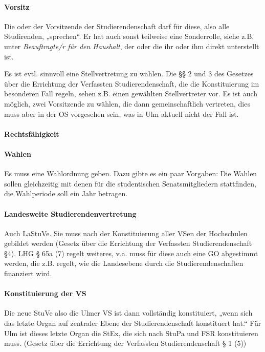 \documentclass[
10pt,
a4paper,
twoside,								%
titlepage=false,							%
draft=false								%
]{scrartcl}
\begin{document}
\paragraph{Vorsitz}

Die oder der Vorsitzende der Studierendenschaft darf für diese, also alle Studirenden, „sprechen“. Er hat auch sonst teilweise eine Sonderrolle, siehe z.B. unter \emph{Beauftragte/r für den Haushalt}, der oder die ihr oder ihm direkt unterstellt ist.

Es ist evtl. sinnvoll eine Stellvertretung zu wählen. Die §§ 2 und 3 des Gesetzes über die Errichtung der Verfassten Studierendenschaft, die die Konstituierung im besonderen Fall regeln, sehen z.B. einen gewählten Stellvertreter vor. Es ist auch möglich, zwei Vorsitzende zu wählen, die dann gemeinschaftlich vertreten, dies muss aber in der OS vorgesehen sein, was in Ulm aktuell nicht der Fall ist.


\paragraph{Rechtsfähigkeit}


\paragraph{Wahlen}

Es muss eine Wahlordnung geben. Dazu gibte es ein paar Vorgaben: Die Wahlen sollen gleichzeitig mit denen für die studentischen Senatsmitgliedern stattfinden, die Wahlperiode soll ein Jahr betragen.


\paragraph{Landesweite Studierendenvertretung}

Auch LaStuVe. Sie muss nach der Konstituierung aller VSen der Hochschulen gebildet werden (Gesetz über die Errichtung der Verfassten Studierendenschaft §4). LHG § 65a (7) regelt weiteres, v.a. muss für diese auch eine GO abgestimmt werden, die z.B. regelt, wie die Landesebene durch die Studierendenschaften finanziert wird.


\paragraph{Konstituierung der VS}

Die neue StuVe also die Ulmer VS ist dann vollständig konstituiert, „wenn sich das letzte Organ auf zentraler Ebene der Studierendenschaft konstituert hat.“ Für Ulm ist dieses letzte Organ die StEx, die sich nach StuPa und FSR konstituieren muss. (Gesetz über die Errichtung der Verfassten Studierendenschaft § 1 (5))
\end{document}
